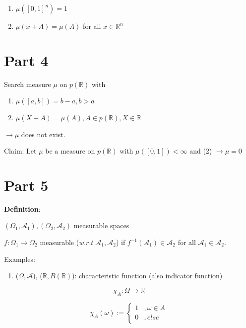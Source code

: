 \documentclass[
]{book}
\providecommand{\tightlist}{%
  \setlength{\itemsep}{0pt}\setlength{\parskip}{0pt}}
\begin{document}
\begin{enumerate}
\def\labelenumi{(\arabic{enumi})}
\item
  \(\mu ([0,1]^n)=1\)
\item
  \(\mu(x+A)=\mu(A)\) for all \(x \in \mathbb{R}^n\)
\end{enumerate}

\hypertarget{part-4}{%
\section{Part 4}\label{part-4}}

Search measure \(\mu\) on \(p(\mathbb{R})\) with

\begin{enumerate}
\def\labelenumi{(\arabic{enumi})}
\item
  \(\mu([a,b])=b-a, b>a\)
\item
  \(\mu(X+A)=\mu(A), A \in p(\mathbb{R}), X \in \mathbb{R}\)
\end{enumerate}

\(\rightarrow \mu\) does not exist.

Claim: Let \(\mu\) be a measure on \(p(\mathbb{R})\) with \(\mu([0,1])<\infty\) and (2) \(\rightarrow \mu=0\)

\hypertarget{part-5}{%
\section{Part 5}\label{part-5}}

\textbf{Definition}:

\((\Omega_1,\mathcal{A}_1), (\Omega_2,\mathcal{A}_2)\) measurable spaces

\(f: \Omega_1 \rightarrow \Omega_2\) measurable (\(w.r.t \; \mathcal{A}_1, \mathcal{A}_2\)) if \(f^{-1}(\mathcal{A}_1) \in \mathcal{A}_2\) for all \(\mathcal{A}_1 \in \mathcal{A}_2\).

Examples:

\begin{enumerate}
\def\labelenumi{(\arabic{enumi})}
\tightlist
\item
  (\(\Omega,\mathcal{A}\)), (\(\mathbb{R},B(\mathbb{R})\)): characteristic function (also indicator function)
\end{enumerate}

\[\chi_A : \Omega \rightarrow \mathbb{R}\]

\[\chi_A (\omega) :=  \begin{cases} 1 &, \omega \in  A \\ 0 &, else\end{cases}\]
\end{document}
